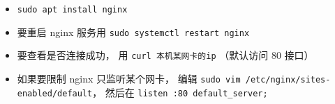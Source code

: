 
\begin{issues}
\issueDraft
\end{issues}

\begin{itemize}
\item \verb|sudo apt install nginx|
\item 要重启 nginx 服务用 \verb|sudo systemctl restart nginx|
\item 要查看是否连接成功， 用 \verb|curl 本机某网卡的ip| （默认访问 80 接口）
\item 如果要限制 nginx 只监听某个网卡， 编辑 \verb|sudo vim /etc/nginx/sites-enabled/default|， 然后在 \verb|listen :80 default_server;|
\end{itemize}
